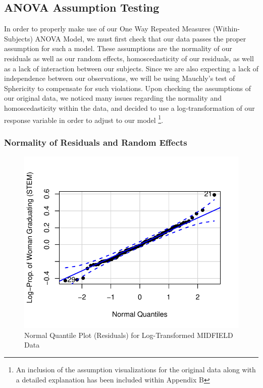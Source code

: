 \documentclass[]{article}
\begin{document}
\subsection{ANOVA Assumption Testing}\label{anova-assumption-testing}

In order to properly make use of our One Way Repeated Measures
(Within-Subjects) ANOVA Model, we must first check that our data passes
the proper assumption for such a model. These assumptions are the
normality of our residuals as well as our random effects,
homoscedasticity of our residuals, as well as a lack of interaction
between our subjects. Since we are also expecting a lack of independence
between our observations, we will be using Mauchly's test of Sphericity
to compensate for such violations. Upon checking the assumptions of our
original data, we noticed many issues regarding the normality and
homoscedasticity within the data, and decided to use a
log-transformation of our response variable in order to adjust to our
model
\footnote{An inclusion of the assumption visualizations for the original data along with a detailed explanation has been included within Appendix B}.

\clearpage

\subsubsection{Normality of Residuals and Random
Effects}\label{normality-of-residuals-and-random-effects}

\begin{figure}
\centering
\includegraphics{Stat_461_Final_Project_Report_files/figure-latex/logNormality-1.pdf}
\caption{Normal Quantile Plot (Residuals) for Log-Transformed MIDFIELD
Data}
\end{figure}
\end{document}

